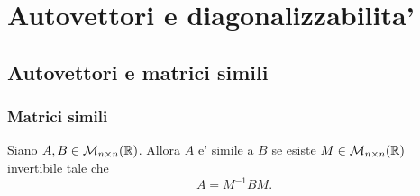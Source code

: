 \chapter{Autovettori e diagonalizzabilita'}

\section{Autovettori e matrici simili}

\subsection{Matrici simili}

\begin{definition}
    Siano $A, B \in \mathcal{M}_{n \times n}(\mathbb{R})$. Allora $A$ e' simile a $B$ se esiste $M \in \mathcal{M}_{n \times n}(\mathbb{R})$ invertibile tale che \begin{equation}
        A = M^{-1}BM.
    \end{equation}
\end{definition}

